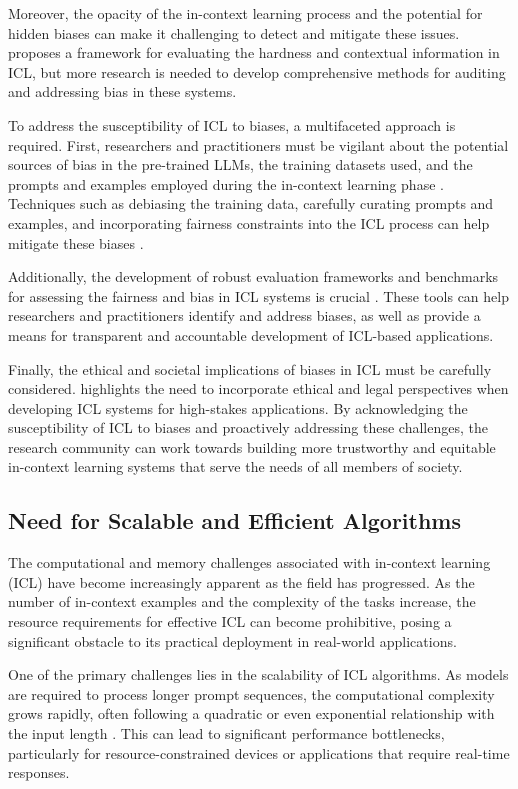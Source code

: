 \documentclass[11pt]{article}
\begin{document}
Moreover, the opacity of the in-context learning process and the potential for hidden biases can make it challenging to detect and mitigate these issues. \cite{ref46} proposes a framework for evaluating the hardness and contextual information in ICL, but more research is needed to develop comprehensive methods for auditing and addressing bias in these systems.

To address the susceptibility of ICL to biases, a multifaceted approach is required. First, researchers and practitioners must be vigilant about the potential sources of bias in the pre-trained LLMs, the training datasets used, and the prompts and examples employed during the in-context learning phase \cite{ref53,ref320,ref321}. Techniques such as debiasing the training data, carefully curating prompts and examples, and incorporating fairness constraints into the ICL process can help mitigate these biases \cite{ref327,ref328}.

Additionally, the development of robust evaluation frameworks and benchmarks for assessing the fairness and bias in ICL systems is crucial \cite{ref329,ref330}. These tools can help researchers and practitioners identify and address biases, as well as provide a means for transparent and accountable development of ICL-based applications.

Finally, the ethical and societal implications of biases in ICL must be carefully considered. \cite{ref58} highlights the need to incorporate ethical and legal perspectives when developing ICL systems for high-stakes applications. By acknowledging the susceptibility of ICL to biases and proactively addressing these challenges, the research community can work towards building more trustworthy and equitable in-context learning systems that serve the needs of all members of society.

\subsection{Need for Scalable and Efficient Algorithms}

The computational and memory challenges associated with in-context learning (ICL) have become increasingly apparent as the field has progressed. As the number of in-context examples and the complexity of the tasks increase, the resource requirements for effective ICL can become prohibitive, posing a significant obstacle to its practical deployment in real-world applications.

One of the primary challenges lies in the scalability of ICL algorithms. As models are required to process longer prompt sequences, the computational complexity grows rapidly, often following a quadratic or even exponential relationship with the input length \cite{ref331}. This can lead to significant performance bottlenecks, particularly for resource-constrained devices or applications that require real-time responses.
\end{document}
